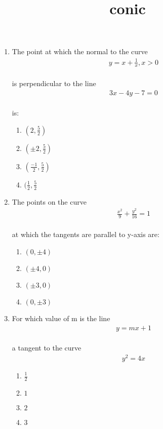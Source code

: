 \documentclass{article}
\title{conic}
\begin{document}
\begin{enumerate}
\item The point at which the normal to the curve 
	\begin{align}
		\text{$y = x+ \frac{1}{x}, x>0$} 
	\end{align}
	\\ is perpendicular to the line 
		\begin{align}
			\text{$3x-4y-7=0$} 
		\end{align}
	\\ is:
\begin{enumerate}[label=(\alph*)]
\item $(2,\frac{5}{2})$
\item $(\pm{2},\frac{5}{2})$
\item $(\frac{-1}{2},\frac{5}{2})$
\item $(\frac{1}{2},\frac{5}{2}$
\end{enumerate}
\item The points on the curve 
	\begin{align}
		\text{$\frac{x^2}{9} + \frac{y^2}{16} = 1$}
	\end{align}
	\\at which the tangents are parallel to y-axis are:
	\begin{enumerate}[label=(\alph*)]
		\item $(0,\pm{4})$
		\item $(\pm{4},0)$
		\item $(\pm{3},0)$
		\item $(0,\pm{3})$
	\end{enumerate}
\item For which value of m is the line 
	\begin{align}
		\text{$y = mx +1$}
	\end{align}
	\\a tangent to the curve 
		\begin{align}
			\text{$y^2= 4x$} 
		\end{align}
	\begin{enumerate}[label=(\alph*)]
		\item $\frac{1}{2}$
		\item $1$
		\item $2$
		\item $3$
	\end{enumerate}
\end{enumerate}
\end{document}
